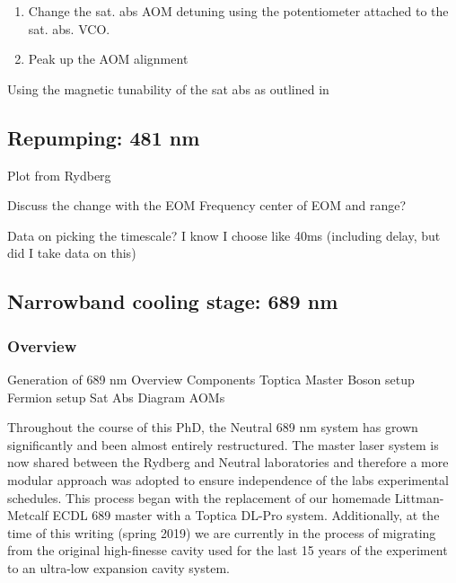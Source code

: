 \begin{enumerate}
\item Change the sat. abs AOM detuning using the potentiometer attached to the sat. abs. VCO. 
\item Peak up the AOM alignment

\end{enumerate}

Using the magnetic tunability of the sat abs as outlined in 

\subsection{Repumping: 481 nm}
\label{ssec:481sys}

Plot from Rydberg

Discuss the change with the EOM
	Frequency center of EOM and range?
	
Data on picking the timescale?
	I know I choose like 40ms (including delay, but did I take data on this)


\subsection{Narrowband cooling stage: 689 nm} \label{ssec:689sys}
\subsubsection{Overview}

Generation of 689 nm
	Overview
	Components
		Toptica Master
		Boson setup
		Fermion setup
		Sat Abs
	Diagram
		AOMs
	
Throughout the course of this PhD, the Neutral 689 nm system has grown significantly and been almost entirely restructured. The master laser system is now shared between the Rydberg and Neutral laboratories and therefore a more modular approach was adopted to ensure independence of the labs experimental schedules. This process began with the replacement of our homemade Littman-Metcalf ECDL 689 master with a Toptica DL-Pro system. Additionally, at the time of this writing (spring 2019) we are currently in the process of migrating from the original high-finesse cavity used for the last 15 years \cite{Nagel2004} of the experiment to an ultra-low expansion cavity system. 

